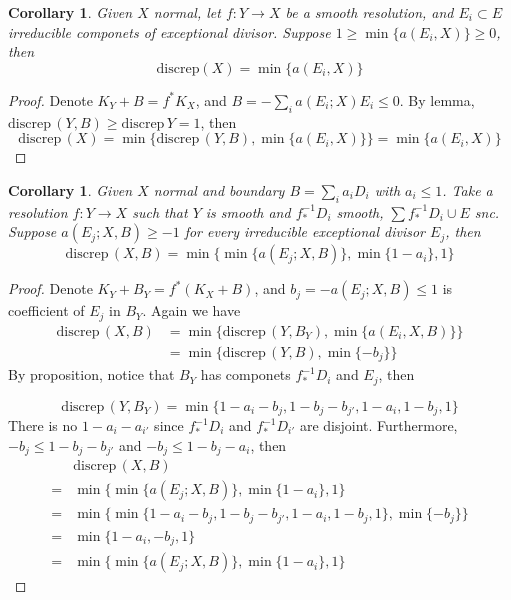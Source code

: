 \documentclass{article}
\newtheorem{cor}[defn]{Corollary}
\begin{document}
\begin{cor}
  Given $ X $ normal, let $ f:Y\to X $ be a smooth resolution, and  $E_i\subset  E $ irreducible componets of exceptional divisor. Suppose $ 1\geqslant \min\{a(E_i,X)\}\geqslant 0 $, then
  \[ \mathrm{discrep}(X)=\min\{a(E_i,X)\} \]
\end{cor}
\begin{proof}
  Denote $ K_Y+B=f^*K_X $, and $ B=-\sum_ia(E_i;X)E_i\leqslant0 $. By lemma, $ \mathrm{discrep}\,(Y,B)\geqslant \mathrm{discrep}\,Y=1 $, then
  \[ \mathrm{discrep}\,(X)=\min\{ \mathrm{discrep}\,(Y,B), \min\{a(E_i,X)\}\} =\min\{a(E_i,X)\}\]
\end{proof}
\begin{cor}
  Given  $ X $ normal and boundary $ B=\sum_ia_iD_i $ with $ a_i\leqslant 1 $. Take a resolution $ f:Y\to X $ such that $ Y $ is smooth and $ f^{-1}_*D_i $ smooth, $ \sum f^{-1}_*D_i \cup E$ snc. Suppose $ a(E_j;X,B)\geqslant -1 $ for every irreducible exceptional divisor $ E_j $, then
  \[ \mathrm{discrep}\, (X,B)=\min\{\min\{a(E_j;X,B)\},\min\{1-a_i\},1\} \]
\end{cor}
\begin{proof}
  Denote $ K_Y+B_Y=f^*(K_X+B) $, and $ b_j=-a(E_j;X,B)\leqslant 1 $ is coefficient of $ E_j $ in $ B_Y $. Again we have
  \begin{equation*}
  \begin{aligned}
  \mathrm{discrep}\,(X,B)&=\min\{ \mathrm{discrep}\,(Y,B_Y), \min\{a(E_i,X,B)\}\}\\
  &=\min\{ \mathrm{discrep}\,(Y,B), \min\{-b_j\}\}
  \end{aligned}
  \end{equation*}
  By proposition,  notice that $ B_Y $ has componets $ f^{-1}_*D_i $ and $ E_j $, then
  
  \[ \mathrm{discrep}\,(Y,B_Y)=\min \{ 1-a_i-b_j, 1-b_j-b_{j'}, 1-a_i, 1-b_j,1 \} \]
  There is no $ 1-a_i-a_{i'} $ since $ f^{-1}_*D_i $ and $ f^{-1}_*D_{i'} $ are disjoint. Furthermore, $ -b_j\leqslant 1-b_j-b_{j'} $ and $ -b_j\leqslant 1-b_j-a_i $, then 
  \begin{equation*}
  \begin{aligned}
  &\mathrm{discrep}\, (X,B)\\
  =&\min\{\min\{a(E_j;X,B)\},\min\{1-a_i\},1\}\\
  =&\min\{ \min \{ 1-a_i-b_j, 1-b_j-b_{j'}, 1-a_i, 1-b_j,1 \}, \min\{-b_j\}\} \\
  =&\min\{  1-a_i,-b_j,1 \} \\
  =&\min\{\min\{a(E_j;X,B)\},\min\{1-a_i\},1\}
  \end{aligned}
  \end{equation*}
  
\end{proof}
\end{document}
